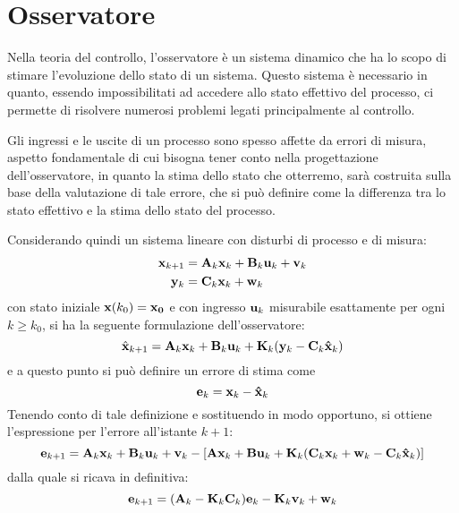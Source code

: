 \section{Osservatore}
Nella teoria del controllo, l'osservatore è un sistema dinamico che ha lo scopo di stimare l'evoluzione dello stato di un sistema. Questo sistema è necessario in quanto, essendo impossibilitati ad accedere allo stato effettivo del processo, ci permette di risolvere numerosi problemi legati principalmente al controllo.

Gli ingressi e le uscite di un processo sono spesso affette da errori di misura, aspetto fondamentale di cui bisogna  tener conto  nella progettazione dell'osservatore, in quanto la stima dello stato che otterremo, sarà costruita sulla base della valutazione di tale errore, che si può definire come la differenza tra lo stato effettivo e la stima dello stato del processo.

\noindent Considerando quindi un sistema lineare con disturbi di processo e di misura:
\begin{align*}
\mathbf{x}_{k+1} &= \mathbf{A}_k\mathbf{x}_k + \mathbf{B}_k\mathbf{u}_k + \mathbf{v}_k \\
\mathbf{y}_k &= \mathbf{C}_k\mathbf{x}_k + \mathbf{w}_k
\end{align*}
con stato iniziale $\mathbf{x}(k_0)=\mathbf{x_0}$ e con ingresso $\mathbf{u}_k$ misurabile  esattamente per ogni $k \geq k_0$, si ha la seguente formulazione dell'osservatore:
\[\hat{\mathbf{x}}_{k+1}=\mathbf{A}_k\mathbf{x}_k+\mathbf{B}_k\mathbf{u}_k+\mathbf{K}_k(\mathbf{y}_k-\mathbf{C}_k\mathbf{\hat{x}}_k)\]
e a questo punto si può definire un errore di stima come  
\[\mathbf{e}_k={\mathbf{x}}_k-{\mathbf{\hat{x}}}_k\]
Tenendo conto di tale definizione e sostituendo in modo opportuno, si ottiene l'espressione per l'errore all'istante $k+1$:
\[\mathbf{e}_{k+1}=\mathbf{A}_k\mathbf{x}_k+\mathbf{B}_k\mathbf{u}_k+\mathbf{v}_k-[\mathbf{A}\mathbf{x}_k+\mathbf{B}\mathbf{u}_k+\mathbf{K}_k(\mathbf{C}_k\mathbf{x}_k+\mathbf{w}_k-\mathbf{C}_k\mathbf{\hat{x}}_k)]\]
dalla quale si ricava in definitiva:
\[\mathbf{e}_{k+1}=(\mathbf{A}_k-\mathbf{K}_k\mathbf{C}_k)\mathbf{e}_k-\mathbf{K}_k\mathbf{v}_k+\mathbf{w}_k\]